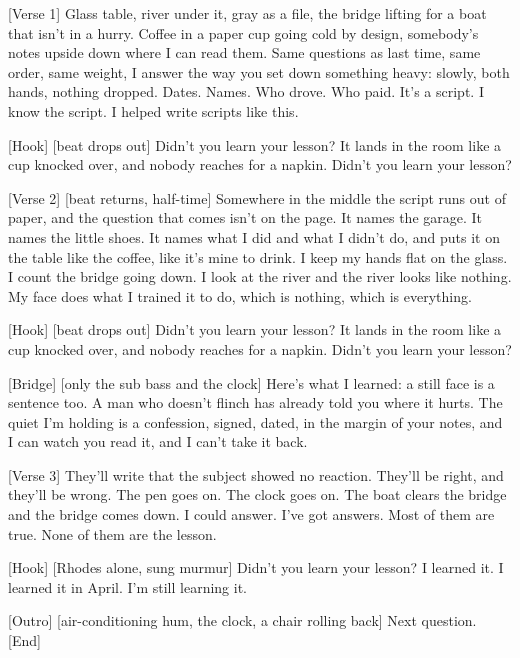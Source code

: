 \begin{lyrics}

[Verse 1]
Glass table, river under it, gray as a file,
the bridge lifting for a boat that isn't in a hurry.
Coffee in a paper cup going cold by design,
somebody's notes upside down where I can read them.
Same questions as last time, same order, same weight,
I answer the way you set down something heavy:
slowly, both hands, nothing dropped.
Dates. Names. Who drove. Who paid.
It's a script. I know the script.
I helped write scripts like this.

[Hook]
[beat drops out]
Didn't you learn your lesson?
It lands in the room like a cup knocked over,
and nobody reaches for a napkin.
Didn't you learn your lesson?

[Verse 2]
[beat returns, half-time]
Somewhere in the middle the script runs out of paper,
and the question that comes isn't on the page.
It names the garage. It names the little shoes.
It names what I did and what I didn't do,
and puts it on the table like the coffee,
like it's mine to drink.
I keep my hands flat on the glass.
I count the bridge going down.
I look at the river and the river looks like nothing.
My face does what I trained it to do,
which is nothing,
which is everything.

[Hook]
[beat drops out]
Didn't you learn your lesson?
It lands in the room like a cup knocked over,
and nobody reaches for a napkin.
Didn't you learn your lesson?

[Bridge]
[only the sub bass and the clock]
Here's what I learned:
a still face is a sentence too.
A man who doesn't flinch
has already told you where it hurts.
The quiet I'm holding is a confession,
signed, dated, in the margin of your notes,
and I can watch you read it,
and I can't take it back.

[Verse 3]
They'll write that the subject showed no reaction.
They'll be right, and they'll be wrong.
The pen goes on. The clock goes on.
The boat clears the bridge and the bridge comes down.
I could answer. I've got answers.
Most of them are true.
None of them are the lesson.

[Hook]
[Rhodes alone, sung murmur]
Didn't you learn your lesson?
I learned it.
I learned it in April.
I'm still learning it.

[Outro]
[air-conditioning hum, the clock, a chair rolling back]
Next question.
[End]
\end{lyrics}

